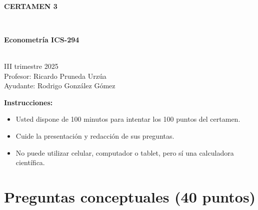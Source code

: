 \documentclass[10pt,a4paper]{article}
\begin{document}
\vspace{5cm}



\begin{center}
\begin{large}
\textbf{\\CERTAMEN 3}
\end{large}\\
\end{center}

\begin{center}
\begin{large}
\textbf{Econometría ICS-294}
\end{large}\\
\vspace{0.2cm}
III trimestre 2025\\
Profesor: Ricardo Pruneda Urzúa\\
Ayudante: Rodrigo González Gómez
\end{center}

\textbf{Instrucciones:} 

\begin{itemize}

    \item Usted dispone de 100 minutos  para intentar los 100 puntos del certamen.
    \item Cuide la presentación y redacción de sus preguntas.
    \item No puede utilizar celular, computador o tablet, pero sí una calculadora científica.
     
\end{itemize}

\section{Preguntas conceptuales (40 puntos)}
\end{document}
